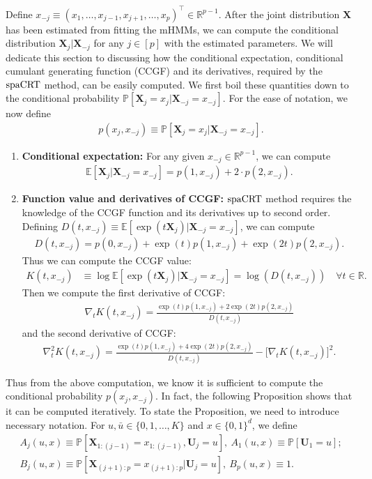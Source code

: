 \documentclass[12pt]{article}
\theoremstyle{definition}
\def\P{\mathbb{P}}
\def\P{\mathbb{P}}
\newcommand{\E}{\mathbb E}								%
\renewcommand{\P}{\mathbb{P}}							%
\newcommand{\prx}{\bm X}								%
\newcommand{\pru}{{\bm U}}								%
\newcommand{\spacrt}{\textnormal{spaCRT}}               %
\begin{document}
Define $x_{-j}\equiv (x_1,\ldots,x_{j-1},x_{j+1},\ldots,x_p)^\top\in\mathbb{R}^{p-1}$. After the joint distribution $\prx$ has been estimated from fitting the mHMMs, we can compute the conditional distribution $\prx_j|\prx_{-j}$ for any $j\in[p]$ with the estimated parameters. We will dedicate this section to discussing how the conditional expectation, conditional cumulant generating function (CCGF) and its derivatives, required by the $\spacrt$ method, can be easily computed. We first boil these quantities down to the conditional probability $\P[\prx_j=x_j|\prx_{-j}=x_{-j}]$. For the ease of notation, we now define 
\begin{align*}
	p(x_j,x_{-j})\equiv \P[\prx_j=x_j|\prx_{-j}=x_{-j}].
\end{align*}
\begin{enumerate}
	\item\textbf{Conditional expectation:} For any given $x_{-j}\in\mathbb{R}^{p-1}$, we can compute
	\begin{align*}
		\E[\prx_j|\prx_{-j}=x_{-j}]=p(1,x_{-j})+2\cdot p(2,x_{-j}).
	\end{align*}
	
	\item\textbf{Function value and derivatives of CCGF:} $\spacrt$ method requires the knowledge of the CCGF function and its derivatives up to second order. Defining $D(t,x_{-j})\equiv \E[\exp(t\prx_j)|\prx_{-j}=x_{-j}]$, we can compute
	\begin{align*}
		D(t,x_{-j})=p(0,x_{-j})+\exp(t)p(1,x_{-j})+\exp(2t)p(2,x_{-j}).
	\end{align*}
	Thus we can compute the CCGF value:
	\begin{align*}
		K(t,x_{-j})
		&
		\equiv\log\E[\exp(t\prx_j)|\prx_{-j}=x_{-j}]=\log(D(t,x_{-j}))\quad\forall t\in\mathbb{R}.
	\end{align*}
	Then we compute the first derivative of CCGF:
	\begin{align*}
		\nabla_t K(t,x_{-j})=\frac{\exp(t)p(1,x_{-j})+2\exp(2t)p(2,x_{-j})}{D(t,x_{-j})}
	\end{align*}
	and the second derivative of CCGF:
	\begin{align*}
		\nabla_t^2 K(t,x_{-j})=\frac{\exp(t)p(1,x_{-j})+4\exp(2t)p(2,x_{-j})}{D(t,x_{-j})}-\big[\nabla_t K(t,x_{-j})\big]^2.
	\end{align*}
\end{enumerate}

Thus from the above computation, we know it is sufficient to compute the conditional probability $p(x_j,x_{-j})$. In fact, the following Proposition shows that it can be computed iteratively. To state the Proposition, we need to introduce necessary notation. For $u,\bar u\in\{0,1,\ldots,K\} $ and $x\in\{0,1\}^d$, we define 
\begin{align}
	A_j(u,x)\equiv \P[\prx_{1:(j-1)}=x_{1:(j-1)},\pru_j=u],\ A_1(u,x)\equiv \P[\pru_1=u];\label{eq:def_A}\\
  B_j(u,x)\equiv \P[\prx_{(j+1):p}=x_{(j+1):p}|\pru_j=u],\ B_p(u,x)\equiv1.\label{eq:def_B}
\end{align}
\end{document}
